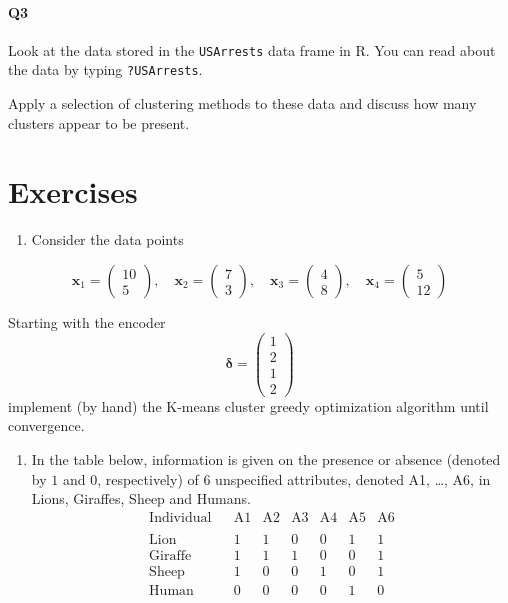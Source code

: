 \documentclass[
]{book}
\providecommand{\tightlist}{%
  \setlength{\itemsep}{0pt}\setlength{\parskip}{0pt}}
\theoremstyle{definition}
\theoremstyle{definition}
\theoremstyle{definition}
\theoremstyle{definition}
\theoremstyle{remark}
\begin{document}
\paragraph*{Q3}\label{q3}

Look at the data stored in the \texttt{USArrests} data frame in R. You can read about the data by typing \texttt{?USArrests}.

Apply a selection of clustering methods to these data and discuss how many clusters appear to be present.

\section{Exercises}\label{exercises-6}

\begin{enumerate}
\def\labelenumi{\arabic{enumi}.}
\tightlist
\item
  Consider the data points
\end{enumerate}

\[\mathbf x_1 =\begin{pmatrix}10\\5\end{pmatrix}, \quad 
\mathbf x_2 =\begin{pmatrix}7\\3\end{pmatrix}, \quad \mathbf x_3 =\begin{pmatrix}4\\8\end{pmatrix}, \quad
\mathbf x_4 =\begin{pmatrix}5\\12\end{pmatrix}\]

Starting with the encoder
\[\boldsymbol \delta= \begin{pmatrix} 1\\2\\1\\2\end{pmatrix}\]
implement (by hand) the K-means cluster greedy optimization algorithm until convergence.

\begin{enumerate}
\def\labelenumi{\arabic{enumi}.}
\setcounter{enumi}{1}
\tightlist
\item
  In the table below, information is given on the presence or absence (denoted by \(1\) and \(0\), respectively) of \(6\) unspecified attributes, denoted A1, \ldots, A6, in Lions, Giraffes, Sheep and Humans.
  \[
  \begin{array}{cccccccc}
  \textrm{Individual}  &&\textrm{A1}&\textrm{A2}&\textrm{A3}&\textrm{A4}&\textrm{A5}&\textrm{A6}\\
  &&&&&&\\
  \textrm{Lion}&&1&1&0&0&1&1\\
  \textrm{Giraffe}&&1&1&1&0&0&1\\
  \textrm{Sheep}&&1&0&0&1&0&1\\
  \textrm{Human}&&0&0&0&0&1&0
  \end{array}
  \]
\end{enumerate}
\end{document}
